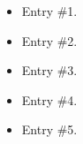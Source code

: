 	\begin{itemize}
		\item Entry \#1.

        \item Entry \#2.

        \item Entry \#3.

        \item Entry \#4.

        \item Entry \#5.
	\end{itemize}